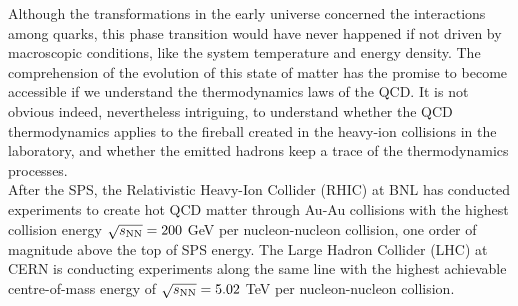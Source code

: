 Although the transformations in the early universe concerned the interactions among quarks,
this phase transition would have never happened if not driven by macroscopic
conditions, like the system temperature and energy density. The comprehension 
of the evolution of this state of matter 
has the promise to become accessible if we understand the thermodynamics 
laws of the QCD. It is not obvious indeed, nevertheless intriguing, 
to understand whether the QCD thermodynamics applies to the fireball 
created in the heavy-ion collisions in the laboratory, and whether the 
emitted hadrons keep a trace of the thermodynamics processes. \\

After the SPS, the Relativistic Heavy-Ion Collider (RHIC) at BNL 
has conducted experiments to create hot QCD matter through Au-Au 
collisions with the highest collision energy $\sqrt{s_{\rm NN}} = 200$ GeV per nucleon-nucleon
collision, one order of magnitude above the top of SPS energy. 
The Large Hadron Collider (LHC) at CERN is conducting experiments 
along the same line with the highest achievable centre-of-mass 
energy of $\sqrt{s_{\rm NN}} = 5.02$ TeV per nucleon-nucleon collision.

